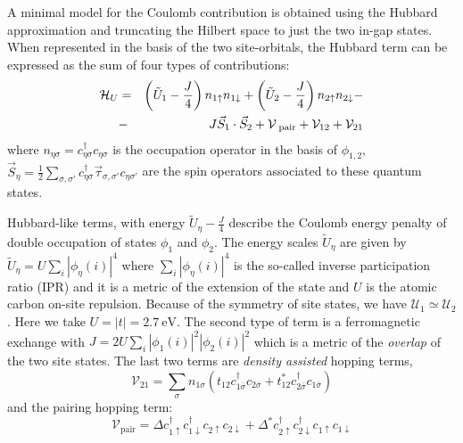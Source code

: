 A minimal model for the Coulomb contribution is obtained using the Hubbard approximation and truncating the Hilbert space to just the two in-gap states. When represented in the basis of the two site-orbitals, the Hubbard term can be expressed as the sum of four types of contributions\cite{Ortiz2019}:
\begin{eqnarray}
{\cal H}_{ U}&=& %
\left(\tilde{U}_1-\frac{J}{4}\right) n_{1\uparrow} n_{1\downarrow} +
\left(\tilde{U}_2 -\frac{J}{4}\right)
 n_{2\uparrow} n_{2\downarrow} 
 -\nonumber\\
&-& J \vec{S}_1\cdot\vec{S}_2+ {\cal V}_\text{ pair}+{\cal V}_{12}+ {\cal V}_{21}
\label{HAMIL}
\end{eqnarray}
where $n_{\eta\sigma}= c^{\dagger}_{\eta\sigma}c_{\eta\sigma}$ is the occupation operator in the basis of $\phi_{1,2}$, 
$\vec{S}_\eta= \frac{1}{2} \sum_{\sigma,\sigma'} c^{\dagger}_{\eta\sigma}\vec{\tau}_{\sigma,\sigma'}c_{\eta\sigma'}$ are the spin operators associated to these quantum states.

Hubbard-like terms, with energy $\tilde{U}_{\eta}-\frac{J}{4}$ describe the Coulomb energy penalty of double occupation of states $\phi_1$ and $\phi_2$. The energy scales $\tilde{U}_{\eta}$ are given by 
$\tilde{U}_{\eta}= U \sum_i |\phi_{\eta}(i)|^4$
where $\sum_i |\phi_{\eta}(i)|^4$ is the so-called inverse participation ratio (IPR) and it is a metric of the extension of the state\cite{Ortiz2019} and $U$ is the atomic carbon on-site repulsion. Because of the symmetry of site states, we have $\mathcal{U}_1\simeq\mathcal{U}_2$.
Here we take $U=|t|=\SI{2.7}{\eV}$. The second type of term is a ferromagnetic exchange
with 
$J= 2U \sum_i |\phi_{1}(i)|^2|\phi_{2}(i)|^2$
which is a metric of the \emph{overlap} of the two site states. 
The last two terms are \emph{density assisted} hopping terms, 
\begin{equation}
  \mathcal{V}_{21} = \sum_{\sigma} n_{1\sigma}
\left(
t_{12} c^{\dagger}_{1\overline{\sigma}} c_{2\overline{\sigma}}
+t_{12}^* c^{\dagger}_{2\overline{\sigma}} c_{1\overline{\sigma}} \right)
\end{equation}
and the pairing hopping term:
\begin{equation}
\mathcal{V}_\text{pair}=
\Delta c^{\dagger}_{1\uparrow} c^{\dagger}_{1\downarrow} c_{2\uparrow}c_{2\downarrow}
+ \Delta^* c^{\dagger}_{2\uparrow} c^{\dagger}_{2\downarrow} c_{1\uparrow}c_{1\downarrow} 
\end{equation}

